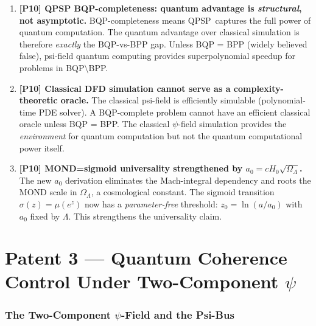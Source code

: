\documentclass[11pt]{article}
\theoremstyle{definition}
\theoremstyle{remark}
\newcommand{\QPSP}{\textsc{QPSP}}
\newcommand{\mufd}{\mu}
\begin{document}
\begin{tcolorbox}[colback=blue!5!white, colframe=blue!60!black,
  title=\textbf{W3i6 CRITICAL RESULTS --- READ FIRST}]
\begin{enumerate}[nosep]
\item \textbf{[P10] QPSP BQP-completeness: quantum advantage is
  \emph{structural}, not asymptotic.}
  BQP-completeness means \QPSP\ captures the full power of quantum
  computation. The quantum advantage over classical simulation is
  therefore \emph{exactly} the BQP-vs-BPP gap. Unless BQP = BPP
  (widely believed false), psi-field quantum computing provides
  superpolynomial speedup for problems in BQP$\setminus$BPP.

\item \textbf{[P10] Classical DFD simulation cannot serve as a
  complexity-theoretic oracle.}
  The classical psi-field is efficiently simulable (polynomial-time
  PDE solver). A BQP-complete problem cannot have an efficient classical
  oracle unless BQP = BPP. The classical $\psi$-field simulation provides
  the \emph{environment} for quantum computation but not the quantum
  computational power itself.

\item \textbf{[P10] MOND=sigmoid universality strengthened by
  $a_0 = cH_0\sqrt{\Omega_\Lambda}$.}
  The new $a_0$ derivation eliminates the Mach-integral dependency and
  roots the MOND scale in $\Omega_\Lambda$, a cosmological constant.
  The sigmoid transition $\sigma(z) = \mufd(e^z)$ now has a
  \emph{parameter-free} threshold: $z_0 = \ln(a/a_0)$ with
  $a_0$ fixed by $\Lambda$. This strengthens the universality claim.
\end{enumerate}
\end{tcolorbox}


\part{Patent 3 --- Quantum Coherence Control Under Two-Component $\psi$}

\section{The Two-Component $\psi$-Field and the Psi-Bus}
\label{sec:two-component-psi-bus}
\end{document}
